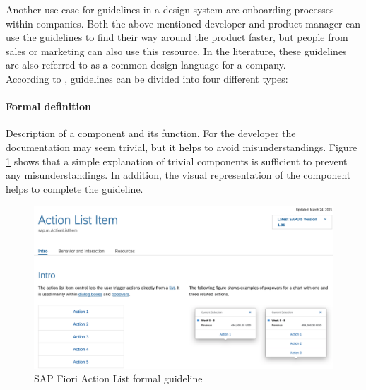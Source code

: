 Another use case for guidelines in a design system are onboarding processes within companies. Both the above-mentioned developer and product manager can use the guidelines to find their way around the product faster, but people from sales or marketing can also use this resource.  In the literature, these guidelines are also referred to as a common design language for a company.  \\
According to \citet*{vesselov_building_2019}, guidelines can be divided into four different types: 


\paragraph*{Formal definition} 
Description of a component and its function. For the developer the documentation may seem trivial, but it helps to avoid misunderstandings. \cite{vesselov_building_2019} Figure \ref{fiori_action_list} shows that a simple explanation of trivial components is sufficient to prevent any misunderstandings. In addition, the visual representation of the component helps to complete the guideline.
\begin{figure}[ht]
\centerline{\includegraphics[width=\linewidth]{images/fiori_action-list_formal.png}}
\caption{SAP Fiori Action List formal guideline \cite{sap_fiori_nodate}}
\label{fiori_action_list}
\end{figure}
\newpage
